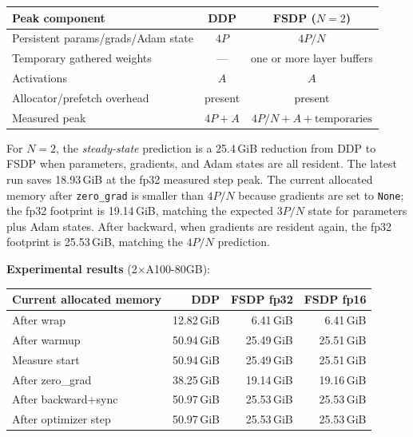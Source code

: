 \documentclass[11pt]{article}
\begin{document}
\begin{center}
\begin{tabular}{l cc}
\toprule
Peak component & DDP & FSDP ($N{=}2$) \\
\midrule
Persistent params/grads/Adam state & $4P$ & $4P/N$ \\
Temporary gathered weights         & ---  & one or more layer buffers \\
Activations                        & $A$  & $A$ \\
Allocator/prefetch overhead        & present & present \\
\midrule
Measured peak                 & $4P{+}A$ & $4P/N + A + \text{temporaries}$ \\
\bottomrule
\end{tabular}
\end{center}

For $N{=}2$, the \emph{steady-state} prediction is a 25.4\,GiB reduction
from DDP to FSDP when parameters, gradients, and Adam states are all resident.
The latest run saves 18.93\,GiB at the fp32 measured step peak.  The current
allocated memory after \texttt{zero\_grad} is smaller than $4P/N$ because
gradients are set to \texttt{None}; the fp32 footprint is 19.14\,GiB, matching
the expected $3P/N$ state for parameters plus Adam states.  After backward,
when gradients are resident again, the fp32 footprint is 25.53\,GiB, matching
the $4P/N$ prediction.

\textbf{Experimental results} (2$\times$A100-80GB):

\begin{center}
\begin{tabular}{l rrr}
\toprule
Current allocated memory & DDP & FSDP fp32 & FSDP fp16 \\
\midrule
After wrap             & 12.82\,GiB &  6.41\,GiB &  6.41\,GiB \\
After warmup           & 50.94\,GiB & 25.49\,GiB & 25.51\,GiB \\
Measure start          & 50.94\,GiB & 25.49\,GiB & 25.51\,GiB \\
After zero\_grad       & 38.25\,GiB & 19.14\,GiB & 19.16\,GiB \\
After backward+sync    & 50.97\,GiB & 25.53\,GiB & 25.53\,GiB \\
After optimizer step   & 50.97\,GiB & 25.53\,GiB & 25.53\,GiB \\
\bottomrule
\end{tabular}
\end{center}
\end{document}
